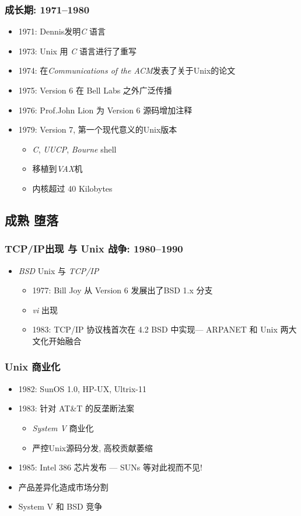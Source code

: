 \documentclass[compress]{beamer}
\begin{document}
\begin{frame}
\frametitle{成长期: 1971--1980}
\begin{itemize}
\item 1971: Dennis发明\emph{C} 语言
\item 1973: Unix 用 \emph{C} 语言进行了重写
\item 1974: 在\textit{Communications of the ACM}发表了关于Unix的论文
\item 1975: Version 6 在 Bell Labs 之外广泛传播
\item 1976: Prof.John Lion 为 Version 6 源码增加注释
\item 1979: Version 7, 第一个现代意义的Unix版本
    \begin{itemize}
    \item \emph{C}, \emph{UUCP}, \emph{Bourne} shell
    \item 移植到\emph{VAX}机
    \item 内核超过 40 Kilobytes
    \end{itemize}
\end{itemize}
\end{frame}

\subsection{成熟 堕落}

\begin{frame}
\frametitle{TCP/IP出现 与 Unix 战争: 1980--1990}
\begin{itemize}
\item \emph{BSD} Unix 与 \emph{TCP/IP}
    \begin{itemize}
    \item 1977: Bill Joy 从 Version 6 发展出了BSD 1.x 分支
	\item \emph{vi} 出现
    \item 1983: TCP/IP 协议栈首次在 4.2 BSD 中实现--- ARPANET 和 
    Unix 两大文化开始融合
    \end{itemize}
\end{itemize}

\end{frame}

\begin{frame}
\frametitle{Unix 商业化}
  \begin{itemize}
  \item 1982: SunOS 1.0, HP-UX, Ultrix-11
  \item 1983: 针对 AT\&T 的反垄断法案
	  \begin{itemize}
	  \item \emph{System V} 商业化
	  \item 严控Unix源码分发, 高校贡献萎缩
	  \end{itemize}
  \item 1985: Intel 386 芯片发布 --- SUNs 等对此视而不见!
  \item 产品差异化造成市场分割
  \item System V 和 BSD 竞争
\end{itemize}

\end{frame}
\end{document}
